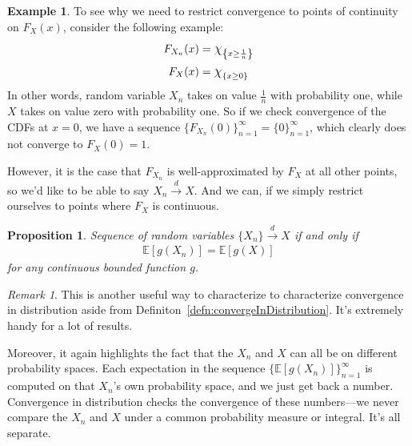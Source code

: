 \documentclass[12pt]{article}
\theoremstyle{plain}
\newtheorem{prop}[thm]{Proposition}
\theoremstyle{definition}
\newtheorem{ex}[thm]{Example}
\theoremstyle{remark}
\newtheorem*{rmk}{Remark}
\newcommand*{\Chi}{\mbox{\large$\chi$}} %
\newcommand{\one}{\Chi}
\newcommand{\E}{\mathbb{E}}
\newcommand{\dto}{\xrightarrow{d}}
\newcommand{\ninf}{_{n=1}^\infty}
\begin{document}
\begin{ex}
To see why we need to restrict convergence to points of continuity on
$F_X(x)$, consider the following example:
\begin{align*}
  F_{X_n}(x) &= \one_{\left\{x\geq \frac{1}{n}\right\}}\\
  F_{X}(x) &= \one_{\left\{x\geq 0\right\}}
\end{align*} In other words, random variable $X_n$ takes on value
$\frac{1}{n}$ with probability one, while $X$ takes on value zero with
probability one.  So if we check convergence of the CDFs at $x=0$, we
have a sequence $\{F_{X_n}(0)\}_{n=1}^\infty=\{0\}_{n=1}^\infty$, which
clearly does not converge to $F_X(0)=1$.

However, it is the case that $F_{X_n}$ is well-approximated by $F_X$ at
all other points, so we'd like to be able to say $X_n\dto X$. And we
can, if we simply restrict ourselves to points where $F_X$ is
continuous.
\end{ex}

\begin{prop}
Sequence of random variables $\{X_n\} \dto X$ if and only if
\begin{align*}
  \E[g(X_n)] = \E[g(X)]
\end{align*}
for any continuous bounded function $g$.
\end{prop}
\begin{rmk}
This is another useful way to characterize to characterize convergence
in distribution aside from Definiton~\ref{defn:convergeInDistribution}.
It's extremely handy for a lot of results.

Moreover, it again highlights the fact that the $X_n$ and $X$ can all be
on different probability spaces. Each expectation in the sequence
$\{\E[g(X_n)]\}\ninf$ is computed on that $X_n$'s own probability space,
and we just get back a number. Convergence in distribution checks the
convergence of these numbers---we never compare the $X_n$ and $X$ under
a common probability measure or integral. It's all separate.
\end{rmk}
\end{document}
